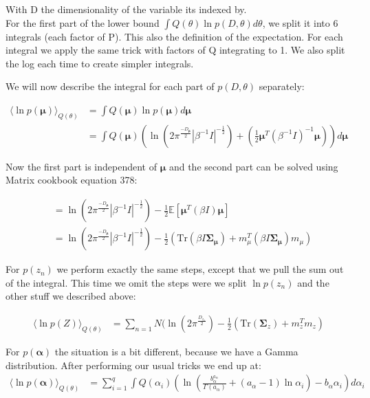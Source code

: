 \documentclass{article}
\def\*#1{\boldsymbol{#1}}
\begin{document}
With D the dimensionality of the variable its indexed by.\\

For the first part of the lower bound $\int Q(\theta) \ln p(D, \theta) d\theta$, we split it into 6 integrals (each factor of P). This also the definition of the expectation. For each integral we apply the same trick with factors of Q integrating to 1. We also split the log each time to create simpler integrals.

We will now describe the integral for each part of $p(D, \theta)$ separately:

\begin{align*}
 \langle \ln p(\*\mu) \rangle_{Q(\theta)} &= \int Q(\*\mu) \ln p(\*\mu) d\*\mu \\
 &= \int Q(\*\mu)(\ln (2\pi^{\frac{-D_{\*\mu}}{2}} |\beta^{-1}I|^{-\frac{1}{2}}) + (\frac12 \*\mu^T(\beta^{-1}I)^{-1}\*\mu )) d\*\mu 
\end{align*}

Now the first part is independent of $\*\mu$ and the second part can be solved using Matrix cookbook equation 378:

\begin{align*}
&= \ln (2\pi^{\frac{-D_{\*\mu}}{2}} |\beta^{-1}I|^{-\frac{1}{2}}) - \frac12  \mathbb{E}[\*\mu^T(\beta I)\*\mu] \\
&= \ln (2\pi^{\frac{-D_{\*\mu}}{2}} |\beta^{-1}I|^{-\frac{1}{2}}) - \frac12 (\mbox{Tr}(\beta I \*\Sigma_{\*\mu}) + m_\mu^T(\beta I \*\Sigma_{\*\mu})m_\mu)
\end{align*}

For $p(z_n)$ we perform exactly the same steps, except that we pull the sum out of the integral. This time we omit the steps were we split $\ln p(z_n)$ and the other stuff we described above:

\begin{align*}
\langle \ln p(Z) \rangle_{Q(\theta)} &= \sum_{n=1}{N} ( \ln(2\pi^{\frac{D_{z_n}}{2}}) - \frac12 (\mbox{Tr}(\*\Sigma_z) + m_z^T m_z)
\end{align*}

For $p(\*\alpha)$ the situation is a bit different, because we have a Gamma distribution. After performing our usual tricks we end up at:
\begin{align*}
\langle \ln p(\*\alpha) \rangle_{Q(\theta)} &= \sum_{i=1}^q \int Q(\alpha_i) (\ln (\frac{b_\alpha^{a_\alpha}}{\Gamma(a_\alpha)} + (a_\alpha - 1) \ln \alpha_i)  - b_\alpha \alpha_i) d\alpha_i
\end{align*}
\end{document}
